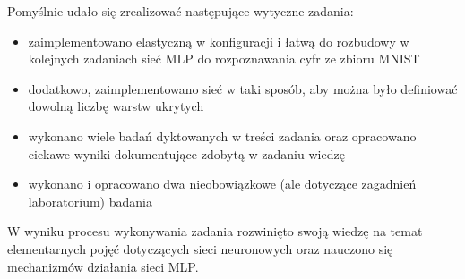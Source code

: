 \documentclass[17pt]{article}
\begin{document}
Pomyślnie udało się zrealizować następujące wytyczne zadania:
\begin{itemize}
\item zaimplementowano elastyczną w konfiguracji i łatwą do rozbudowy w kolejnych zadaniach sieć MLP do rozpoznawania cyfr ze zbioru MNIST
\item dodatkowo, zaimplementowano sieć w taki sposób, aby można było definiować dowolną liczbę warstw ukrytych
\item wykonano wiele badań dyktowanych w treści zadania oraz opracowano ciekawe wyniki dokumentujące zdobytą w zadaniu wiedzę
\item wykonano i opracowano dwa nieobowiązkowe (ale dotyczące zagadnień laboratorium) badania
\end{itemize}

W wyniku procesu wykonywania zadania rozwinięto swoją wiedzę na temat elementarnych pojęć dotyczących sieci neuronowych oraz nauczono się mechanizmów działania sieci MLP.
\end{document}
